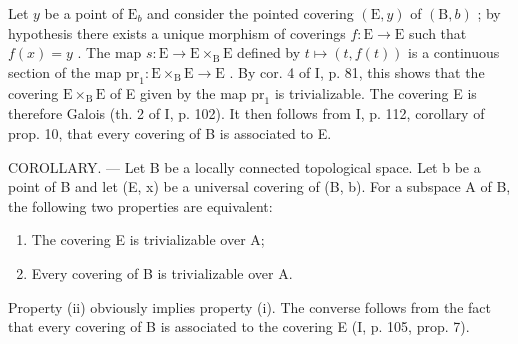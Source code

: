 Let \(y\) be a point of \(\mathrm{E}_b\) and consider the pointed covering \((\mathrm{E},y)\) of \((\mathrm{B},b)\) ; by hypothesis there exists a unique morphism of coverings \(f\colon \mathrm{E}\to \mathrm{E}\) such that \(f(x) = y\) . The map \(s\colon \mathrm{E}\to \mathrm{E}\times_{\mathrm{B}}\mathrm{E}\) defined by \(t\mapsto (t,f(t))\) is a continuous section of the map \(\mathrm{pr}_1\colon \mathrm{E}\times_{\mathrm{B}}\mathrm{E}\to \mathrm{E}\) . By cor. 4 of I, p. 81, this shows that the covering \(\mathrm{E}\times_{\mathrm{B}}\mathrm{E}\) of E given by the map \(\mathrm{pr}_1\) is trivializable. The covering E is therefore Galois (th. 2 of I, p. 102). It then follows from I, p. 112, corollary of prop. 10, that every covering of B is associated to E.

COROLLARY. --- Let B be a locally connected topological space. Let b be a point of B and let (E, x) be a universal covering of (B, b). For a subspace A of B, the following two properties are equivalent:

\begin{enumerate}
\def\labelenumi{(\roman{enumi})}
\item
  The covering E is trivializable over A;
\item
  Every covering of B is trivializable over A.
\end{enumerate}

Property (ii) obviously implies property (i). The converse follows from the fact that every covering of B is associated to the covering E (I, p. 105, prop. 7).

